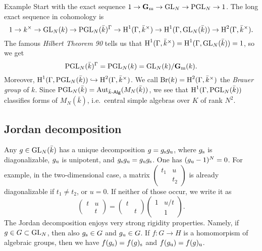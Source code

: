 \begin{enonce}[remark]{Example}
Start with the exact sequence 
$1 \to \mathbf{G}_{\mathrm{m}} \to \operatorname{GL}_N \to \operatorname{PGL}_N \to 1$. 
The long exact sequence in cohomology is 
\[
  1 \to k^\times \to \operatorname{GL}_N(k) \to \operatorname{PGL}_N(\bar k)^\Gamma \to \operatorname{H}^1(\Gamma,\bar k^\times) \to \operatorname{H}^1(\Gamma,\operatorname{GL}_N(\bar k)) \to \operatorname{H}^2(\Gamma,\bar k^\times) .
\]
The famous \emph{Hilbert Theorem 90} tells us that 
$\operatorname{H}^1(\Gamma, \bar k^\times) = \operatorname{H}^1(\Gamma,\operatorname{GL}_N(\bar k)) = 1$, so 
we get 
\[
  \operatorname{PGL}_N(\bar k)^\Gamma = \operatorname{PGL}_N(k) = \operatorname{GL}_N(k)/\mathbf{G}_{\mathrm{m}}(k) .
\]
Moreover, $\operatorname{H}^1(\Gamma,\operatorname{PGL}_N(\bar k))\hookrightarrow \operatorname{H}^2(\Gamma,\bar k^\times)$. We call 
$\operatorname{Br}(k)=\operatorname{H}^2(\Gamma,\bar k^\times)$ the \emph{Brauer group} of $k$. 
Since $\operatorname{PGL}_N(\bar k)  = \operatorname{Aut}_{\bar k\text{-}\mathsf{Alg}}(M_N(\bar k))$, we see that 
$\operatorname{H}^1(\Gamma,\operatorname{PGL}_N(\bar k))$ classifies forms of 
$M_N(\bar k)$, i.e.~central simple algebras over $K$ of rank 
$N^2$. 
\end{enonce}





\subsection{Jordan decomposition}

Any $g\in \operatorname{GL}_N(\bar k)$ has a unique decomposition 
$g=g_{\mathrm{s}} g_{\mathrm{u}}$, where $g_{\mathrm{s}}$ is diagonalizable, $g_{\mathrm{u}}$ 
is unipotent, and $g_{\mathrm{s}} g_{\mathrm{u}} = g_{\mathrm{u}} g_{\mathrm{s}}$. One has 
$(g_{\mathrm{u}} - 1)^N=0$. For example, in the two-dimensional case, a matrix 
$\begin{pmatrix} t_1 & u \\ & t_2\end{pmatrix}$ is already diagonalizable if 
$t_1\ne t_2$, or $u=0$. If neither of those occur, we write it as 
\[
  \begin{pmatrix} t & u \\ & t \end{pmatrix} = \begin{pmatrix} t \\ & t\end{pmatrix} \begin{pmatrix} 1 & u/t \\ & 1 \end{pmatrix} .
\]
The Jordan decomposition enjoys very strong rigidity properties. Namely, 
if $g\in G\subset \operatorname{GL}_N$, then also $g_{\mathrm{s}}\in G$ and 
$g_{\mathrm{u}} \in G$. If $f:G\to H$ is a homomorpism of algebraic groups, then 
we have $f(g_{\mathrm{s}}) = f(g)_{\mathrm{s}}$ and $f(g_{\mathrm{u}}) = f(g)_{\mathrm{u}}$. 





